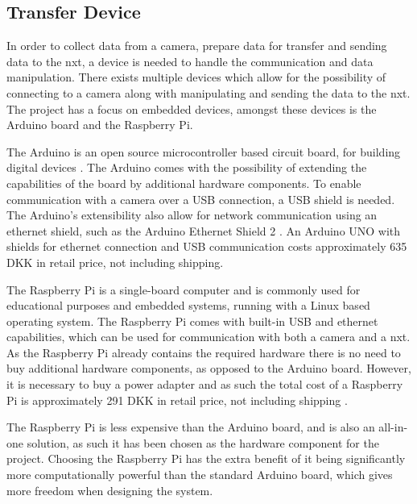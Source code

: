 \subsection{Transfer Device}
\label{sec:rsp}
In order to collect data from a camera, prepare data for transfer and sending data to the \gls{nxt}, a device is needed to handle the communication and data manipulation.
There exists multiple devices which allow for the possibility of connecting to a camera along with manipulating and sending the data to the \gls{nxt}. The project has a focus on embedded devices, amongst these devices is the \gls{Arduino} board and the Raspberry Pi.

The \gls{Arduino} is an open source microcontroller based circuit board, for building digital devices \cite{ard_1}. The Arduino comes with the possibility of extending the capabilities of the board by additional hardware components. To enable communication with a camera over a USB connection, a USB shield is needed. The \gls{Arduino}'s extensibility also allow for network communication using an ethernet shield, such as the \gls{Arduino} Ethernet Shield 2 \cite{eth_shl_1}. An \gls{Arduino} UNO with shields for ethernet connection and USB communication costs approximately 635 DKK in retail price, not including shipping.

The Raspberry Pi is a single-board computer \cite{rsp} and is commonly used for educational purposes and embedded systems, running with a Linux based operating system. The Raspberry Pi comes with built-in USB and ethernet capabilities, which can be used for communication with both a camera and a \gls{nxt}. As the Raspberry Pi already contains the required hardware there is no need to buy additional hardware components, as opposed to the \gls{Arduino} board. However, it is necessary to buy a power adapter and as such the total cost of a Raspberry Pi is approximately 291 DKK in retail price, not including shipping \cite{rs_pi_board}\cite{rs_chg}.

The Raspberry Pi is less expensive than the \gls{Arduino} board, and is also an all-in-one solution, as such it has been chosen as the hardware component for the project. Choosing the Raspberry Pi has the extra benefit of it being significantly more computationally powerful than the standard \gls{Arduino} board, which gives more freedom when designing the system.


